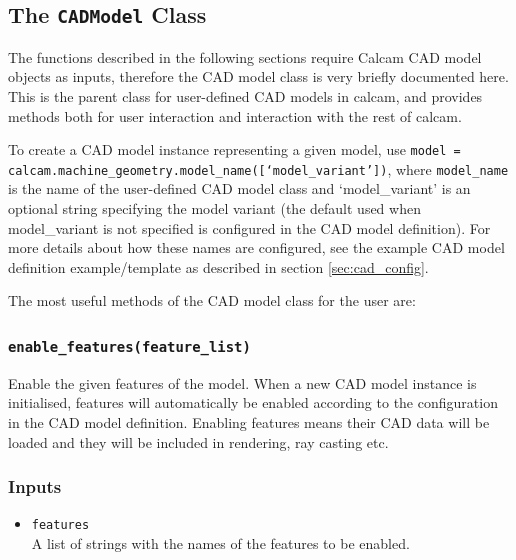 \documentclass[12pt]{article}
\newcommand{\code}[1]{\texttt{#1}}
\begin{document}
\subsection{The \code{CADModel} Class}
The functions described in the following sections require Calcam CAD model objects as inputs, therefore the CAD model class is very briefly documented here. This is the parent class for user-defined CAD models in calcam, and provides methods both for user interaction and interaction with the rest of calcam. 

To create a CAD model instance representing a given model, use \code{model = calcam.machine\_geometry.model\_name([`model\_variant'])}, where \code{model\_name} is the name of the user-defined CAD model class and `model\_variant' is an optional string specifying the model variant (the default used when model\_variant is not specified is configured in the CAD model definition). For more details about how these names are configured, see the example CAD model definition example/template as described in section \ref{sec:cad_config}.

The most useful methods of the CAD model class for the user are:
\subsubsection*{\code{enable\_features(feature\_list)}}
\begin{adjustwidth}{0.5cm}{0cm}
Enable the given features of the model. When a new CAD model instance is initialised, features will automatically be enabled according to the configuration in the CAD model definition. Enabling features means their CAD data will be loaded and they will be included in rendering, ray casting etc.
\subsubsection*{Inputs}
\begin{itemize}
\item{\code{features}\\A list of strings with the names of the features to be enabled.}
\end{itemize}
\end{adjustwidth}
\end{document}
